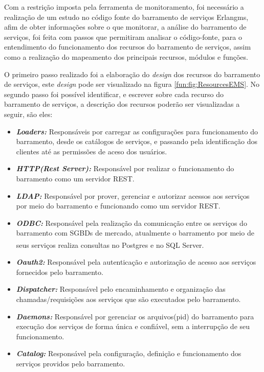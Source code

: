 Com a restrição imposta pela ferramenta de monitoramento, foi necessário a realização de um estudo no código fonte do barramento de serviços Erlangms, afim de obter informações sobre o que monitorar, a análise do barramento de serviços, foi feita com passos que permitiram analisar o código-fonte, para o entendimento do funcionamento dos recursos do barramento de serviços, assim como a realização do mapeamento dos principais recursos, módulos e funções. 

O primeiro passo realizado foi a elaboração do \textit{design} dos recursos do barramento de serviços, este \textit{design} pode ser visualizado na figura \ref{fun:fig:ResourcesEMS}. No segundo passo foi possível identificar, e escrever sobre cada recurso do barramento de serviços, a descrição dos recursos poderão ser visualizadas a seguir, são eles:

\begin{itemize}
    \item \textit{\textbf{Loaders:}}
    Responsáveis por carregar as configurações para funcionamento do barramento, desde os catálogos de serviços, e passando pela identificação dos clientes até as permissões de aceso dos usuários.  
    \item \textit{\textbf{HTTP(Rest Server):}}
    Responsável por realizar o funcionamento do barramento como um servidor \acrshort{REST}.
    \item \textit{\textbf{LDAP:}}
    Responsável por prover, gerenciar e autorizar acessos aos serviços por meio do barramento e funcionando como um servidor REST.
    \item \textit{\textbf{ODBC:}}
    Responsável pela realização da comunicação entre os serviços do barramento com SGBDs de mercado, atualmente o barramento por meio de seus serviços realiza consultas no Postgres\textsuperscript{\textregistered} e no SQL Server\textsuperscript{\textregistered}.
    \item \textit{\textbf{Oauth2:}}
    Responsável pela autenticação e autorização de acesso aos serviços fornecidos pelo barramento.
    \item \textit{\textbf{Dispatcher:}}
    Responsável pelo encaminhamento e organização das chamadas/requisições aos serviços que são executados pelo barramento.
    \item \textit{\textbf{Daemons:}}
    Responsável por gerenciar os arquivos(pid) do barramento para execução dos serviços de forma única e confiável, sem a interrupção de seu funcionamento. 
    \item \textit{\textbf{Catalog:}}
    Responsável pela configuração, definição e funcionamento dos serviços providos pelo barramento.
\end{itemize}

